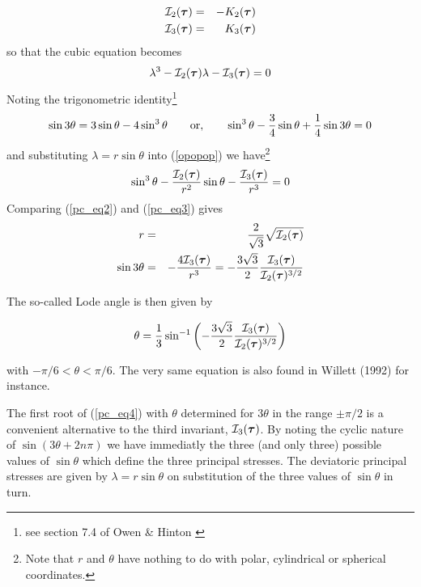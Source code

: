 \begin{eqnarray}
{\cal I}_2({\bm \tau}) &=&  - K_2({\bm \tau}) \\
{\cal I}_3({\bm \tau}) &=&  K_3({\bm \tau}) 
\end{eqnarray}
so that the cubic equation becomes
\begin{equation} 
\lambda^3 -  {\cal I}_2({\bm \tau}) \lambda -  {\cal I}_3({\bm \tau}) =0 \label{opopop}
\end{equation}
Noting the trigonometric identity\footnote{see section 7.4 of Owen \& Hinton \cite{owhi}}
\begin{equation}
\sin 3\theta = 3 \sin \theta - 4 \sin^3 \theta
\qquad
{\rm or,}
\qquad
\sin^3 \theta - \frac{3}{4}\sin \theta + \frac{1}{4} \sin 3\theta = 0\label{pc_eq2}
\end{equation}
and substituting $\lambda=r\sin \theta$ into (\ref{opopop}) we have\footnote{Note that $r$ and $\theta$ have nothing 
to do with polar, cylindrical or spherical coordinates.}
\begin{equation}
\sin^3 \theta -\frac{ {\cal I}_2({\bm \tau})   }{r^2} \sin \theta -\frac{ {\cal I}_3({\bm \tau})  }{r^3}=0\label{pc_eq3}
\end{equation}
Comparing (\ref{pc_eq2}) and (\ref{pc_eq3}) gives
\begin{eqnarray}
r&=&\frac{2}{\sqrt{3}}\sqrt{ {\cal I}_2({\bm \tau})  }\label{pc_eq4bis} \\
\sin 3 \theta &=& -\frac{4 {\cal I}_3({\bm \tau})  }{r^3}=-\frac{3\sqrt{3}}{2}\frac{ {\cal I}_3({\bm \tau}) }{ {\cal I}_2({\bm \tau}) ^{3/2}} \label{pc_eq4}
\end{eqnarray}

The so-called Lode angle  \cite{zico74} is then given by 
\begin{mdframed}[backgroundcolor=blue!5]
\begin{equation}
\theta=\frac{1}{3} \sin^{-1} \left( -\frac{3\sqrt{3}}{2} \frac{{\cal I}_3({\bm \tau})}{{\cal I}_2({\bm \tau})^{3/2}} \right)
\label{eq:lodang}
\end{equation}
\end{mdframed}
with $-\pi/6 <\theta <\pi/6 $. The very same equation is also found in Willett (1992) \cite{will92} for instance.

The first root of (\ref{pc_eq4}) with $\theta$ determined for $3\theta$ in the 
range $\pm \pi/2$ is a convenient alternative to the third invariant, ${\cal I}_3({\bm \tau})$. 
By noting the cyclic nature of $\sin (3\theta+2n \pi)$ we have immediatly the three 
(and only three) possible values of $\sin \theta $ which define the three principal stresses. 
The deviatoric principal stresses are given by $\lambda=r \sin \theta$ on substitution 
of the three values of $\sin \theta$ in turn. 

